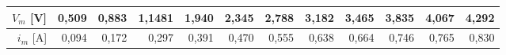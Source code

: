 

\begin{tabular}{r|r|r|r|r|r|r|r|r|r|r|r}
$V_m$ [V]&0,509&0,883&1,1481&1,940&2,345&2,788&3,182&3,465&3,835& 4,067&4,292\\\hline
$i_m$ [A]&0,094&0,172&0,297 &0,391&0,470&0,555&0,638&0,664&0,746&0,765&0,830
\end{tabular}
